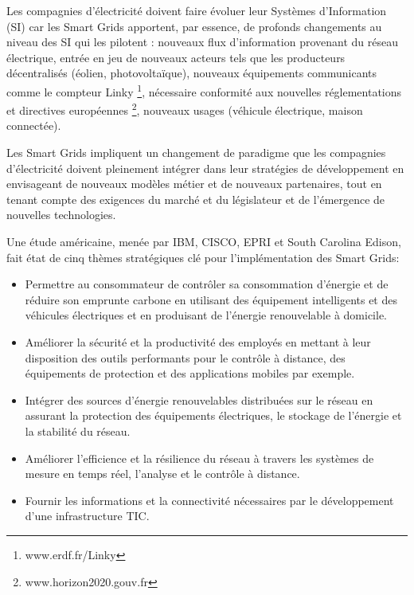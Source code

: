 Les compagnies d'électricité doivent faire évoluer leur Systèmes d'Information (SI) car les Smart Grids apportent, par essence, de profonds changements au niveau des SI qui les pilotent  : nouveaux flux d'information provenant du réseau électrique, entrée en jeu de nouveaux acteurs tels que les producteurs décentralisés (éolien, photovoltaïque), nouveaux équipements communicants comme le compteur Linky \footnote{www.erdf.fr/Linky}, nécessaire conformité aux nouvelles réglementations et directives européennes \footnote{www.horizon2020.gouv.fr}, nouveaux usages (véhicule électrique, maison connectée). 

Les Smart Grids impliquent un changement de paradigme que les compagnies d'électricité doivent pleinement intégrer dans leur stratégies de développement en envisageant de nouveaux modèles métier et de nouveaux partenaires, tout en tenant compte des exigences du marché et du législateur et de l'émergence de nouvelles technologies. 

Une étude américaine, menée par IBM, CISCO, EPRI et South Carolina Edison, fait état de cinq thèmes stratégiques clé pour l'implémentation des Smart Grids:
\begin{itemize}
\item Permettre au consommateur de contrôler sa consommation d'énergie et de réduire son emprunte carbone en utilisant des équipement intelligents et des véhicules électriques et en produisant de l'énergie renouvelable à domicile.
\item Améliorer la sécurité et la productivité des employés en mettant à leur disposition des outils performants pour le contrôle à distance, des équipements de protection et des applications mobiles par exemple.
\item Intégrer des sources d'énergie renouvelables distribuées sur le réseau en assurant la protection des équipements électriques, le stockage de l'énergie et la stabilité du réseau.
\item Améliorer l'efficience et la résilience du réseau à travers les systèmes de mesure en temps réel, l'analyse et le contrôle à distance.

\item Fournir les informations et la connectivité nécessaires par le développement d'une infrastructure TIC.
\end{itemize}

